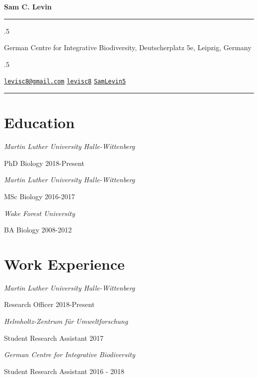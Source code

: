 \documentclass[11pt,]{article}
\begin{document}
\centerline{\huge \bf Sam C. Levin}

\vspace{2 mm}

\hrule

\vspace{2 mm}


\moveleft.5\hoffset\centerline{German Centre for Integrative Biodiversity, Deutscherplatz 5e, Leipzig,
Germany}
\moveleft.5\hoffset\centerline{ \faEnvelopeO \hspace{1 mm} \href{mailto:}{\tt \href{mailto:levisc8@gmail.com}{\nolinkurl{levisc8@gmail.com}}} \hspace{1 mm}  \faGithub \hspace{1 mm} \href{http://github.com/levisc8}{\tt levisc8} \hspace{1 mm}   \faTwitter \hspace{1 mm} \href{https:/twitter.com/SamLevin5}{\tt SamLevin5} \hspace{1 mm}   }

\vspace{2 mm}

\hrule


\section{Education}\label{education}

\emph{Martin Luther University Halle-Wittenberg}

PhD Biology \hfill 2018-Present

\emph{Martin Luther University Halle-Wittenberg}

MSc Biology \hfill 2016-2017

\emph{Wake Forest University}

BA Biology \hfill 2008-2012

\section{Work Experience}\label{work-experience}

\emph{Martin Luther University Halle-Wittenberg}

Research Officer \hfill 2018-Present

\emph{Helmholtz-Zentrum für Umweltforschung }

Student Research Assistant \hfill 2017

\emph{German Centre for Integrative Biodiversity}

Student Research Assistant \hfill 2016 - 2018
\end{document}
